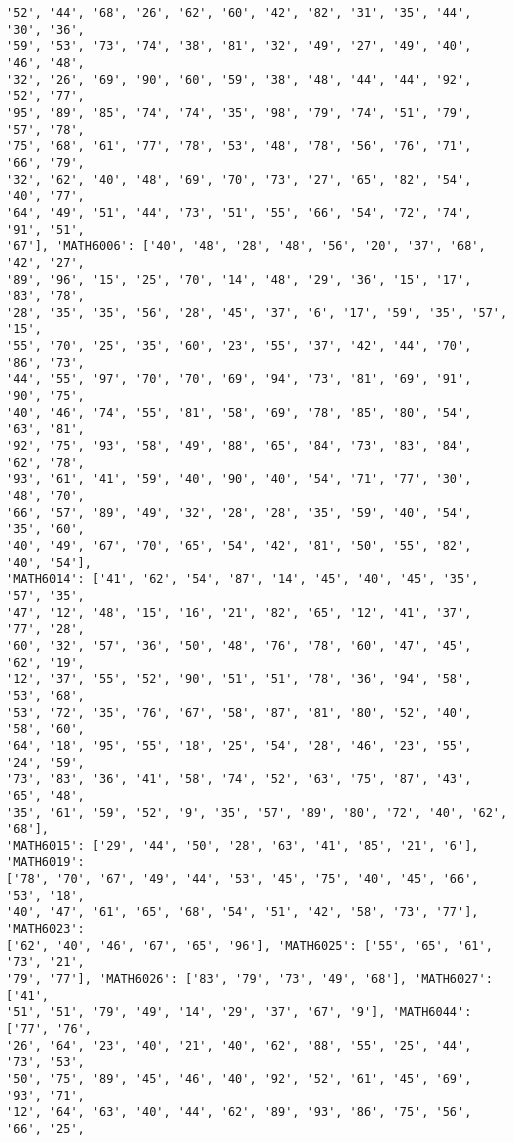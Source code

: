 \documentclass[11pt]{article}
\begin{document}
\begin{Verbatim}[commandchars=\\\{\}]
'52', '44', '68', '26', '62', '60', '42', '82', '31', '35', '44', '30', '36',
'59', '53', '73', '74', '38', '81', '32', '49', '27', '49', '40', '46', '48',
'32', '26', '69', '90', '60', '59', '38', '48', '44', '44', '92', '52', '77',
'95', '89', '85', '74', '74', '35', '98', '79', '74', '51', '79', '57', '78',
'75', '68', '61', '77', '78', '53', '48', '78', '56', '76', '71', '66', '79',
'32', '62', '40', '48', '69', '70', '73', '27', '65', '82', '54', '40', '77',
'64', '49', '51', '44', '73', '51', '55', '66', '54', '72', '74', '91', '51',
'67'], 'MATH6006': ['40', '48', '28', '48', '56', '20', '37', '68', '42', '27',
'89', '96', '15', '25', '70', '14', '48', '29', '36', '15', '17', '83', '78',
'28', '35', '35', '56', '28', '45', '37', '6', '17', '59', '35', '57', '15',
'55', '70', '25', '35', '60', '23', '55', '37', '42', '44', '70', '86', '73',
'44', '55', '97', '70', '70', '69', '94', '73', '81', '69', '91', '90', '75',
'40', '46', '74', '55', '81', '58', '69', '78', '85', '80', '54', '63', '81',
'92', '75', '93', '58', '49', '88', '65', '84', '73', '83', '84', '62', '78',
'93', '61', '41', '59', '40', '90', '40', '54', '71', '77', '30', '48', '70',
'66', '57', '89', '49', '32', '28', '28', '35', '59', '40', '54', '35', '60',
'40', '49', '67', '70', '65', '54', '42', '81', '50', '55', '82', '40', '54'],
'MATH6014': ['41', '62', '54', '87', '14', '45', '40', '45', '35', '57', '35',
'47', '12', '48', '15', '16', '21', '82', '65', '12', '41', '37', '77', '28',
'60', '32', '57', '36', '50', '48', '76', '78', '60', '47', '45', '62', '19',
'12', '37', '55', '52', '90', '51', '51', '78', '36', '94', '58', '53', '68',
'53', '72', '35', '76', '67', '58', '87', '81', '80', '52', '40', '58', '60',
'64', '18', '95', '55', '18', '25', '54', '28', '46', '23', '55', '24', '59',
'73', '83', '36', '41', '58', '74', '52', '63', '75', '87', '43', '65', '48',
'35', '61', '59', '52', '9', '35', '57', '89', '80', '72', '40', '62', '68'],
'MATH6015': ['29', '44', '50', '28', '63', '41', '85', '21', '6'], 'MATH6019':
['78', '70', '67', '49', '44', '53', '45', '75', '40', '45', '66', '53', '18',
'40', '47', '61', '65', '68', '54', '51', '42', '58', '73', '77'], 'MATH6023':
['62', '40', '46', '67', '65', '96'], 'MATH6025': ['55', '65', '61', '73', '21',
'79', '77'], 'MATH6026': ['83', '79', '73', '49', '68'], 'MATH6027': ['41',
'51', '51', '79', '49', '14', '29', '37', '67', '9'], 'MATH6044': ['77', '76',
'26', '64', '23', '40', '21', '40', '62', '88', '55', '25', '44', '73', '53',
'50', '75', '89', '45', '46', '40', '92', '52', '61', '45', '69', '93', '71',
'12', '64', '63', '40', '44', '62', '89', '93', '86', '75', '56', '66', '25',

\end{Verbatim}
\end{document}

